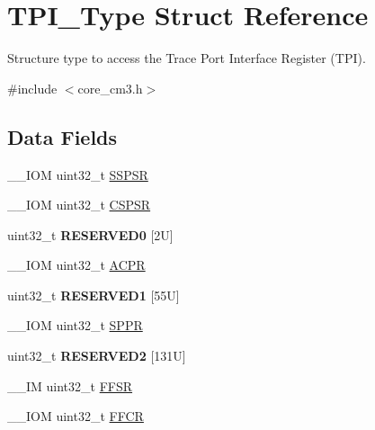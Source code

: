 \hypertarget{struct_t_p_i___type}{}\section{T\+P\+I\+\_\+\+Type Struct Reference}
\label{struct_t_p_i___type}


Structure type to access the Trace Port Interface Register (T\+PI).  




{\ttfamily \#include $<$core\+\_\+cm3.\+h$>$}

\subsection*{Data Fields}
\begin{DoxyCompactItemize}
\item 
\+\_\+\+\_\+\+I\+OM uint32\+\_\+t \hyperlink{struct_t_p_i___type_a1aa8bba158b6ac122676301f17a362d9}{S\+S\+P\+SR}
\item 
\+\_\+\+\_\+\+I\+OM uint32\+\_\+t \hyperlink{struct_t_p_i___type_abf4a378b17278d98d2a5f9315fce7a5e}{C\+S\+P\+SR}
\item 
\mbox{\label{struct_t_p_i___type_aa57754b8f88bb376d184aaf6fe74f391}} 
uint32\+\_\+t {\bfseries R\+E\+S\+E\+R\+V\+E\+D0} \mbox{[}2\+U\mbox{]}
\item 
\+\_\+\+\_\+\+I\+OM uint32\+\_\+t \hyperlink{struct_t_p_i___type_a49a770cf0b7ec970f919f8ac22634fff}{A\+C\+PR}
\item 
\mbox{\label{struct_t_p_i___type_a4d91e8d0f8791a2d137be359e6ca669f}} 
uint32\+\_\+t {\bfseries R\+E\+S\+E\+R\+V\+E\+D1} \mbox{[}55\+U\mbox{]}
\item 
\+\_\+\+\_\+\+I\+OM uint32\+\_\+t \hyperlink{struct_t_p_i___type_ae9673e1acb75a46ed9852fd7a557cb7d}{S\+P\+PR}
\item 
\mbox{\label{struct_t_p_i___type_ad34dc93fd7d41ef2c3365292cc8a178d}} 
uint32\+\_\+t {\bfseries R\+E\+S\+E\+R\+V\+E\+D2} \mbox{[}131\+U\mbox{]}
\item 
\+\_\+\+\_\+\+IM uint32\+\_\+t \hyperlink{struct_t_p_i___type_a2a049b49e9da6772d38166397ce8fc70}{F\+F\+SR}
\item 
\+\_\+\+\_\+\+I\+OM uint32\+\_\+t \hyperlink{struct_t_p_i___type_afe3ca1410c32188d26be24c4ee9e180c}{F\+F\+CR}
\item 

\end{DoxyCompactItemize}
